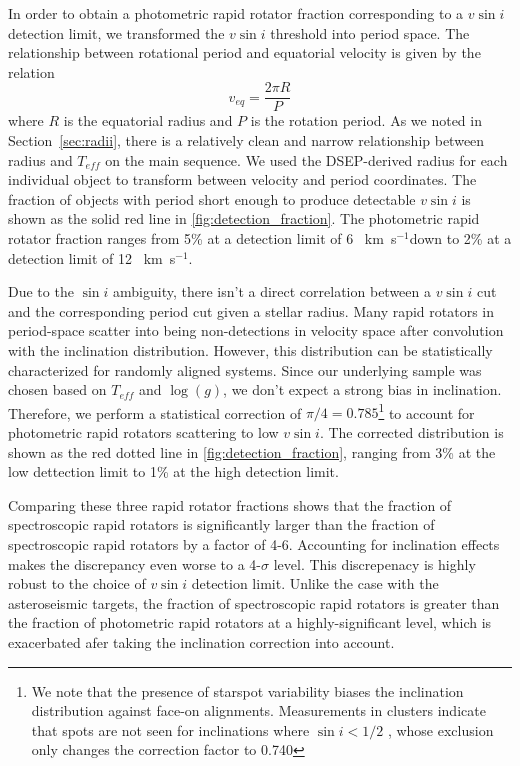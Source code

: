 \documentclass[manuscript]{aastex6}
\newcommand{\vsini}{\ensuremath{v \sin i}}
\newcommand{\Teff}{\ensuremath{T_{eff}}}
\newcommand{\logg}{\ensuremath{\log(g)}}
\newcommand{\kms}{\textrm{~km~s}\ensuremath{^{-1}}}
\begin{document}
In order to obtain a photometric rapid rotator fraction corresponding to
a \vsini{} detection limit, we transformed the \vsini{} threshold into period 
space. The relationship between rotational period and equatorial velocity is 
given by the relation 
\begin{displaymath}
    v_{eq} = \frac{2 \pi R}{P} 
\end{displaymath}
where \(R\) is the equatorial radius and \(P\) is the rotation period. As we
noted in Section~\ref{sec:radii}, there is a relatively clean and narrow
relationship between radius and \Teff{} on the main sequence. We used the 
DSEP-derived radius for each individual object to transform  between
velocity and period coordinates. The fraction of objects with period
short enough to produce detectable \vsini{} is shown as the solid red
line in \cref{fig:detection_fraction}. The photometric rapid rotator fraction
ranges from 5\% at a detection limit of 6 \kms down to 2\% at a 
detection limit of 12 \kms.


Due to the \(\sin i\) ambiguity, there isn't a direct correlation
between a \vsini{} cut and the corresponding period cut given a stellar radius.
Many rapid rotators in period-space scatter into being non-detections in
velocity space after convolution with the inclination distribution. However,
this distribution can be statistically characterized for randomly
aligned systems. Since our underlying sample was chosen based on
\Teff{} and \logg{}, we don't expect a strong bias in inclination.
Therefore, we perform a statistical correction of \(\pi/4=0.785\)\footnote{We 
  note that the presence of starspot variability biases the
    inclination distribution against face-on alignments. Measurements
    in clusters indicate that spots are not seen for inclinations where 
    \(\sin i < 1/2\) \citep{Jackson10}, whose exclusion only changes the 
correction factor to 0.740} 
to account for photometric rapid rotators scattering to low
\vsini{}. The  corrected distribution is shown as the red dotted line in
\cref{fig:detection_fraction}, ranging from 3\% at the low dettection
limit to 1\% at the high detection limit.

Comparing these three rapid rotator fractions shows that the fraction of
spectroscopic rapid rotators is significantly larger than the fraction
of spectroscopic rapid rotators by a factor of 4-6. Accounting for
inclination effects makes the discrepancy even worse to a 4-\(\sigma\)
level. This discrepenacy is highly robust to the choice of
\vsini{} detection limit. Unlike  
the case with the asteroseismic targets, the fraction of spectroscopic rapid
rotators is greater than the fraction of photometric rapid
rotators at a highly-significant level, which is exacerbated afer taking the
inclination correction into account.
\end{document}

